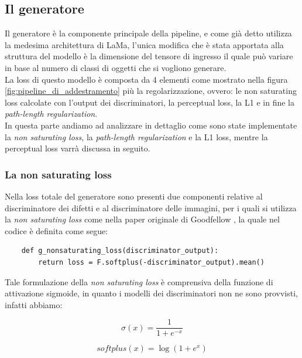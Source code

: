 \subsection{Il generatore}
Il generatore è la componente principale della pipeline, e come già detto utilizza la medesima architettura di LaMa, l'unica modifica che
è stata apportata alla struttura del modello è la dimensione del tensore di ingresso il quale può variare in base al numero di classi di oggetti che
si vogliono generare.\\
La loss di questo modello è composta da 4 elementi come mostrato nella figura \ref{fig:pipeline_di_addestramento} più la regolarizzazione, ovvero: le non saturating loss 
calcolate con l'output dei discriminatori, la perceptual loss, la L1 e in fine la \textit{path-length regularization}.\\
In questa parte andiamo ad analizzare in dettaglio come sono state implementate la \textit{non saturating loss}, la \textit{path-length regularization} e la L1 loss,
mentre la perceptual loss varrà discussa in seguito.

\subsubsection{La non saturating loss}
Nella loss totale del generatore sono presenti due componenti relative al discriminatore dei difetti e al discriminatore delle immagini, per i quali si utilizza la 
\textit{non saturating loss} come nella paper originale di Goodfellow \cite{goodfellow2014generative}, la quale nel codice è definita come segue:

\begin{verbatim}
    def g_nonsaturating_loss(discriminator_output):
        return loss = F.softplus(-discriminator_output).mean()
\end{verbatim}

Tale formulazione della \textit{non saturating loss} è comprensiva della funzione di attivazione sigmoide, 
in quanto i modelli dei discriminatori non ne sono provvisti, infatti abbiamo:

\begin{equation}
    \sigma(x) = \frac{1}{1 + e^{-x}}
    \label{eq:sigmoid}
\end{equation}

\begin{equation}
    softplus(x) = \log(1 + e^{x})
    \label{eq:softplus}
\end{equation}

